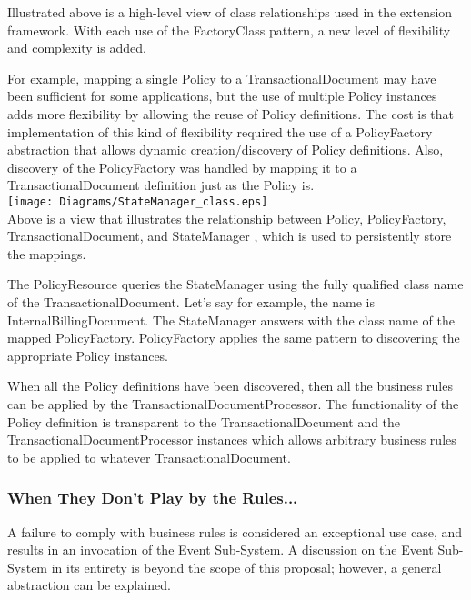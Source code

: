 \documentclass[12pt]{article}
\begin{document}
  Illustrated above is a high-level view of class relationships used in the
extension framework. With each use of the \sf FactoryClass \rm pattern, a new
level of flexibility and complexity is added. 
 
For example, mapping a single \sf Policy \rm
to a \sf TransactionalDocument \rm may have been sufficient for some 
applications, but the use of multiple \sf Policy \rm instances adds more 
flexibility by allowing the reuse of \sf Policy \rm definitions. The cost is
that implementation of this kind of flexibility required the use of a 
\sf PolicyFactory \rm abstraction that allows dynamic creation/discovery of
\sf Policy \rm definitions. Also, discovery of the \sf PolicyFactory \rm
was handled by mapping it to a \sf TransactionalDocument \rm definition just
as the \sf Policy \rm is. \\

  \texttt{[image: Diagrams/StateManager\_class.eps]} \\

  Above is a view that illustrates the relationship between \sf Policy\rm,
\sf PolicyFactory\rm, \sf TransactionalDocument\rm, and \sf StateManager\rm
, which is used to persistently store the mappings. 

The \sf PolicyResource \rm queries the \sf StateManager \rm using the fully 
qualified class name of the \sf TransactionalDocument\rm. Let's say for example,
the name is \sf InternalBillingDocument\rm. The \sf StateManager \rm answers
with the class name of the mapped \sf PolicyFactory\rm. \sf PolicyFactory \rm
applies the same pattern to discovering the appropriate \sf Policy \rm 
instances. 

When all the \sf Policy \rm definitions have been discovered, then all the
business rules can be applied by the \sf TransactionalDocumentProcessor\rm. 
The functionality of the \sf Policy \rm definition is transparent to the 
\sf TransactionalDocument \rm and the \sf TransactionalDocumentProcessor \rm
instances which allows arbitrary business rules to be applied to whatever
\sf TransactionalDocument\rm.

\subsubsection{When They Don't Play by the Rules...}
A failure to comply with business rules is considered an exceptional use case,
 and results in an invocation of the Event Sub-System. A discussion on the Event
 Sub-System in its entirety is beyond the scope of this proposal; however, a 
general abstraction can be explained. \\
\end{document}
